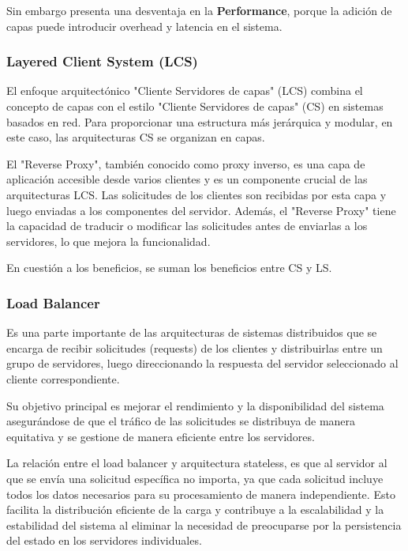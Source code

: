 \documentclass{article}
\begin{document}
		Sin embargo presenta una desventaja en la \textbf{Performance}, porque la adición de capas puede introducir overhead y latencia en el sistema.
	
		
		
		
		\subsubsection{Layered Client System (LCS)}
		El enfoque arquitectónico "Cliente Servidores de capas" (LCS) combina el concepto de capas con el estilo "Cliente Servidores de capas" (CS) en sistemas basados en red. Para proporcionar una estructura más jerárquica y modular, en este caso, las arquitecturas CS se organizan en capas.
		
		El "Reverse Proxy", también conocido como proxy inverso, es una capa de aplicación accesible desde varios clientes y es un componente crucial de las arquitecturas LCS. Las solicitudes de los clientes son recibidas por esta capa y luego enviadas a los componentes del servidor. Además, el "Reverse Proxy" tiene la capacidad de traducir o modificar las solicitudes antes de enviarlas a los servidores, lo que mejora la funcionalidad.
		
		En cuestión a los beneficios, se suman los beneficios entre CS y LS.
		
		\subsubsection{Load Balancer}\label{sec:load_balancer}
		Es una parte importante de las arquitecturas de sistemas distribuidos que se encarga de recibir solicitudes (requests) de los clientes y distribuirlas entre un grupo de servidores, luego direccionando la respuesta del servidor seleccionado al cliente correspondiente. 
		
		Su objetivo principal es mejorar el rendimiento y la disponibilidad del sistema asegurándose de que el tráfico de las solicitudes se distribuya de manera equitativa y se gestione de manera eficiente entre los servidores.
		
		La relación entre el load balancer y arquitectura stateless, es que al servidor al que se envía una solicitud específica no importa, ya que cada solicitud incluye todos los datos necesarios para su procesamiento de manera independiente. Esto facilita la distribución eficiente de la carga y contribuye a la escalabilidad y la estabilidad del sistema al eliminar la necesidad de preocuparse por la persistencia del estado en los servidores individuales.
		
\end{document}

